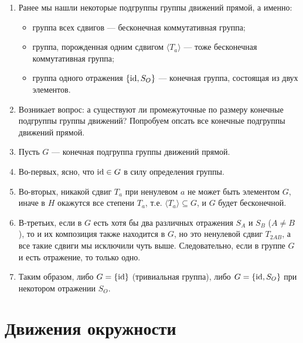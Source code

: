 \begin{enumerate}
\item Ранее мы нашли некоторые подгруппы группы движений прямой, а именно:
\begin{itemize}
\item группа всех сдвигов --- бесконечная коммутативная группа;
\item группа, порожденная одним сдвигом $\langle T_a\rangle$ --- тоже бесконечная коммутативная группа;
\item группа одного отражения $\{\mathrm{id}, S_O\}$ --- конечная группа, состоящая из двух элементов.
\end{itemize}
\item Возникает вопрос: а существуют ли промежуточные по размеру конечные подгруппы группы движений? Попробуем опсать все конечные подгруппы движений прямой.
\item Пусть $G$ --- конечная подгруппа группы движений прямой.
\item Во-первых, ясно, что $\mathrm{id}\in G$ в силу определения группы.
\item Во-вторых, никакой сдвиг $T_a$ при ненулевом $a$ не может быть элементом $G$, иначе в $H$ окажутся все степени $T_a$, т.е. $\langle T_a\rangle \subseteq G$, и $G$ будет бесконечной.
\item В-третьих, если в $G$ есть хотя бы два различных отражения $S_A$ и $S_B$ ($A\ne B$), то и их композиция также находится в $G$, но это ненулевой сдвиг $T_{2AB}$, а все такие сдвиги мы исключили чуть выше. Следовательно, если в группе $G$ и есть отражение, то только одно.
\item Таким образом, либо $G=\{\mathrm{id}\}$ (тривиальная группа), либо $G=\{\mathrm{id}, S_O\}$ при некотором отражении $S_O$.
\end{enumerate}




\section{Движения окружности}


